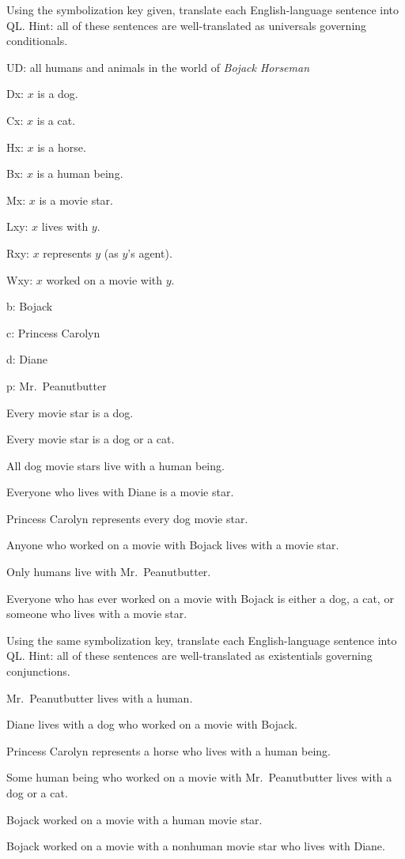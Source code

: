 \practiceproblems

\problempart
\label{pr.QLbojackall}
Using the symbolization key given, translate each English-language sentence into QL. Hint: all of these sentences are well-translated as universals governing conditionals.
\begin{ekey}
\item[UD:] all humans and animals in the world of \emph{Bojack Horseman}
\item[Dx:] $x$ is a dog.
\item[Cx:] $x$ is a cat.
\item[Hx:] $x$ is a horse.
\item[Bx:] $x$ is a human being.
\item[Mx:] $x$ is a movie star.
\item[Lxy:] $x$ lives with $y$.
\item[Rxy:] $x$ represents $y$ (as $y$'s agent).
\item[Wxy:] $x$ worked on a movie with $y$.
\item[b:] Bojack
\item[c:] Princess Carolyn
\item[d:] Diane
\item[p:] Mr.\ Peanutbutter
\end{ekey}
\begin{earg}
\item Every movie star is a dog.
\item Every movie star is a dog or a cat.
\item All dog movie stars live with a human being.
\item Everyone who lives with Diane is a movie star.
\item Princess Carolyn represents every dog movie star.
\item Anyone who worked on a movie with Bojack lives with a movie star.
\item Only humans live with Mr.\ Peanutbutter.
\item Everyone who has ever worked on a movie with Bojack is either a dog, a cat, or someone who lives with a movie star.
\end{earg}

\solutions
\problempart
\label{pr.QLbojacksome}
Using the same symbolization key, translate each English-language sentence into QL. Hint: all of these sentences are well-translated as existentials governing conjunctions.
\begin{earg}
\item Mr.\ Peanutbutter lives with a human.
\item Diane lives with a dog who worked on a movie with Bojack.
\item Princess Carolyn represents a horse who lives with a human being.
\item Some human being who worked on a movie with Mr.\ Peanutbutter lives with a dog or a cat.
\item Bojack worked on a movie with a human movie star.
\item Bojack worked on a movie with a nonhuman movie star who lives with Diane.
\end{earg}

